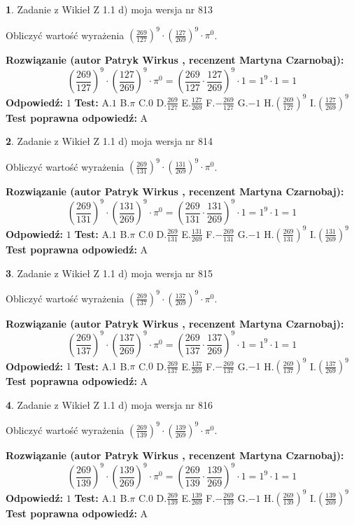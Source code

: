 \documentclass[12pt, a4paper]{article}
\theoremstyle{definition} %
\newtheorem{zad}{}
\newcommand{\zadStart}[1]{\begin{zad}#1\newline}
\newcommand{\zadStop}{\end{zad}}
\newcommand{\rozwStart}[2]{\noindent \textbf{Rozwiązanie (autor #1 , recenzent #2): }\newline}
\newcommand{\rozwStop}{\newline}
\newcommand{\odpStart}{\noindent \textbf{Odpowiedź:}\newline}
\newcommand{\odpStop}{\newline}
\newcommand{\testStart}{\noindent \textbf{Test:}\newline}
\newcommand{\testStop}{\newline}
\newcommand{\kluczStart}{\noindent \textbf{Test poprawna odpowiedź:}\newline}
\newcommand{\kluczStop}{\newline}
\begin{document}
\zadStart{Zadanie z Wikieł Z 1.1 d) moja wersja nr 813}

Obliczyć wartość wyrażenia $(\frac{269}{127})^{9} \cdot (\frac{127}{269})^{9} \cdot \pi^{0}$.
\zadStop
\rozwStart{Patryk Wirkus}{Martyna Czarnobaj}
$$(\frac{269}{127})^{9} \cdot (\frac{127}{269})^{9} \cdot \pi^{0} = (\frac{269}{127} \cdot \frac{127}{269})^{9} \cdot 1 = 1^{9} \cdot 1 = 1$$
\rozwStop
\odpStart
$1$
\odpStop
\testStart
A.$1$ B.$\pi$ C.$0$ D.$\frac{269}{127}$ E.$\frac{127}{269}$
F.$-\frac{269}{127}$ G.$-1$
H.$(\frac{269}{127})^{9}$
I.$(\frac{127}{269})^{9}$
\testStop
\kluczStart
A
\kluczStop



\zadStart{Zadanie z Wikieł Z 1.1 d) moja wersja nr 814}

Obliczyć wartość wyrażenia $(\frac{269}{131})^{9} \cdot (\frac{131}{269})^{9} \cdot \pi^{0}$.
\zadStop
\rozwStart{Patryk Wirkus}{Martyna Czarnobaj}
$$(\frac{269}{131})^{9} \cdot (\frac{131}{269})^{9} \cdot \pi^{0} = (\frac{269}{131} \cdot \frac{131}{269})^{9} \cdot 1 = 1^{9} \cdot 1 = 1$$
\rozwStop
\odpStart
$1$
\odpStop
\testStart
A.$1$ B.$\pi$ C.$0$ D.$\frac{269}{131}$ E.$\frac{131}{269}$
F.$-\frac{269}{131}$ G.$-1$
H.$(\frac{269}{131})^{9}$
I.$(\frac{131}{269})^{9}$
\testStop
\kluczStart
A
\kluczStop



\zadStart{Zadanie z Wikieł Z 1.1 d) moja wersja nr 815}

Obliczyć wartość wyrażenia $(\frac{269}{137})^{9} \cdot (\frac{137}{269})^{9} \cdot \pi^{0}$.
\zadStop
\rozwStart{Patryk Wirkus}{Martyna Czarnobaj}
$$(\frac{269}{137})^{9} \cdot (\frac{137}{269})^{9} \cdot \pi^{0} = (\frac{269}{137} \cdot \frac{137}{269})^{9} \cdot 1 = 1^{9} \cdot 1 = 1$$
\rozwStop
\odpStart
$1$
\odpStop
\testStart
A.$1$ B.$\pi$ C.$0$ D.$\frac{269}{137}$ E.$\frac{137}{269}$
F.$-\frac{269}{137}$ G.$-1$
H.$(\frac{269}{137})^{9}$
I.$(\frac{137}{269})^{9}$
\testStop
\kluczStart
A
\kluczStop



\zadStart{Zadanie z Wikieł Z 1.1 d) moja wersja nr 816}

Obliczyć wartość wyrażenia $(\frac{269}{139})^{9} \cdot (\frac{139}{269})^{9} \cdot \pi^{0}$.
\zadStop
\rozwStart{Patryk Wirkus}{Martyna Czarnobaj}
$$(\frac{269}{139})^{9} \cdot (\frac{139}{269})^{9} \cdot \pi^{0} = (\frac{269}{139} \cdot \frac{139}{269})^{9} \cdot 1 = 1^{9} \cdot 1 = 1$$
\rozwStop
\odpStart
$1$
\odpStop
\testStart
A.$1$ B.$\pi$ C.$0$ D.$\frac{269}{139}$ E.$\frac{139}{269}$
F.$-\frac{269}{139}$ G.$-1$
H.$(\frac{269}{139})^{9}$
I.$(\frac{139}{269})^{9}$
\testStop
\kluczStart
A
\kluczStop
\end{document}
